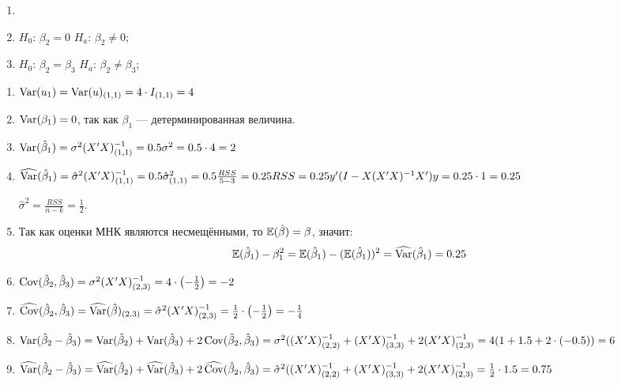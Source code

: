 \begin{problem}

\begin{enumerate}[resume]
\item {} 
\item {}  $H_0$: $\beta_2 = 0$  $H_a$: $\beta_2 \neq 0$;
\item {}  $H_0$: $\beta_2 = \beta_3$  $H_a$: $\beta_2 \neq \beta_3$;
\end{enumerate}


\begin{sol}
\begin{enumerate}
\item $\Var(u_1)=\Var(u)_{(1,1)}=4\cdot I_{(1,1)}=4$
\item $\Var(\beta_1)=0$, так как $\beta_1$ — детерминированная величина.
\item $\Var(\hb_1)=\sigma^2(X'X)^{-1}_{(1,1)}=0.5\sigma^2=0.5\cdot 4=2$
\item $\hVar(\hb_1)=\hat\sigma^2(X'X)^{-1}_{(1,1)}=0.5\hat\sigma^2_{(1,1)}=0.5\frac{RSS}{5-3}=0.25RSS=0.25y'(I-X(X'X)^{-1}X')y=0.25\cdot 1=0.25$

$\hat\sigma^2=\frac{RSS}{n-k}=\frac12$.

\item Так как оценки МНК являются несмещёнными, то $\E(\hb)=\beta$, значит:
\[
\E(\hb_1)-\beta_1^2=\E(\hb_1)-(\E(\hb_1))^2=\hVar(\hb_1)=0.25
\]

\item $\Cov(\hb_2,\hb_3)=\sigma^2(X'X)^{-1}_{(2,3)}=4\cdot\left(-\frac12\right)=-2$
\item $\hCov(\hb_2,\hb_3)=\hVar(\hat\beta)_{(2,3)}=\hat\sigma^2(X'X)^{-1}_{(2,3)}=\frac{1}{2}\cdot\left(-\frac12\right)=-\frac14$

\item $\Var(\hb_2-\hb_3)=\Var(\hb_2)+\Var(\hb_3)+2\Cov(\hb_2,\hb_3)=\sigma^2((X'X)^{-1}_{(2,2)}+(X'X)^{-1}_{(3,3)}+2(X'X)^{-1}_{(2,3)}=4(1+1.5+2\cdot(-0.5))=6$

\item $\hVar(\hb_2-\hb_3)=\hVar(\hb_2)+\hVar(\hb_3)+2\hCov(\hb_2,\hb_3)=\hat\sigma^2((X'X)^{-1}_{(2,2)}+(X'X)^{-1}_{(3,3)}+2(X'X)^{-1}_{(2,3)}=\frac{1}{2}\cdot1.5=0.75$


\end{enumerate}
\end{sol}
\end{problem}
